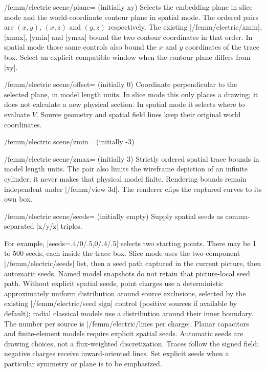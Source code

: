 \begin{key}{/femm/electric scene/plane= (initially xy)}
Selects the embedding plane in slice mode and the world-coordinate contour plane
in spatial mode. The ordered pairs are $(x,y)$, $(x,z)$ and $(y,z)$ respectively.
The existing |/femm/electric/xmin|, |xmax|, |ymin| and |ymax| bound the two contour
coordinates in that order. In spatial mode those same controls also bound the
$x$ and $y$ coordinates of the trace box. Select an explicit compatible window
when the contour plane differs from |xy|.
\end{key}
\begin{key}{/femm/electric scene/offset= (initially 0)}
Coordinate perpendicular to the selected plane, in model length units. In slice
mode this only places a drawing; it does not calculate a new physical section.
In spatial mode it selects where to evaluate $V$. Source geometry and spatial
field lines keep their original world coordinates.
\end{key}
\begin{key}{/femm/electric scene/zmin= (initially -3)}
\end{key}
\begin{key}{/femm/electric scene/zmax= (initially 3)}
Strictly ordered spatial trace bounds in model length units. The pair also
limits the wireframe depiction of an infinite cylinder; it never makes that
physical model finite. Rendering bounds remain independent under
|/femm/view 3d|. The renderer clips the captured curves to its own box.
\end{key}
\begin{key}{/femm/electric scene/seeds= (initially empty)}
Supply spatial seeds as comma-separated |x/y/z| triples.\par
For example, |seeds={.4/0/.5,0/.4/.5}| selects two starting points.
There may be 1 to 500 seeds, each inside the trace box.
Slice mode uses the two-component |/femm/electric/seeds| list, then a seed
path captured in the current picture, then automatic seeds. Named model
snapshots do not retain that picture-local seed path.
Without explicit spatial seeds, point charges use a deterministic approximately
uniform distribution around source exclusions, selected by the existing
|/femm/electric/seed sign| control (positive sources if available by default); radial classical
models use a distribution around their inner boundary. The number per source
is |/femm/electric/lines per charge|. Planar capacitors and finite-element models
require explicit spatial seeds. Automatic seeds are drawing choices, not a
flux-weighted discretization. Traces follow the signed field; negative charges
receive inward-oriented lines. Set explicit seeds when a particular symmetry
or plane is to be emphasized.
\end{key}

